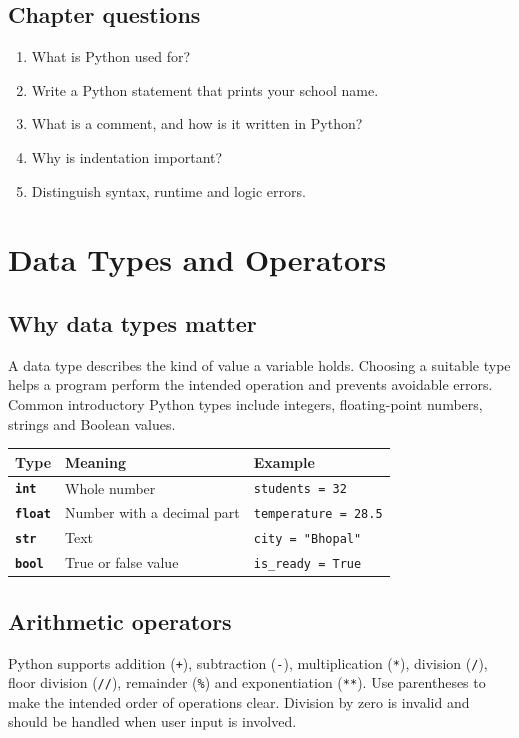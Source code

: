 \documentclass[11pt,openany,oneside]{book}
\begin{document}
\section{Chapter questions}
\begin{enumerate}
\item What is Python used for?
\item Write a Python statement that prints your school name.
\item What is a comment, and how is it written in Python?
\item Why is indentation important?
\item Distinguish syntax, runtime and logic errors.
\end{enumerate}

\chapter{Data Types and Operators}
\section{Why data types matter}
A data type describes the kind of value a variable holds. Choosing a suitable type helps a program perform the intended operation and prevents avoidable errors. Common introductory Python types include integers, floating-point numbers, strings and Boolean values.

\begin{center}
\begin{tabularx}{\textwidth}{>{\bfseries}p{} X X}
\toprule
Type & Meaning & Example\\
\midrule
\texttt{int} & Whole number & \texttt{students = 32}\\
\texttt{float} & Number with a decimal part & \texttt{temperature = 28.5}\\
\texttt{str} & Text & \texttt{city = "Bhopal"}\\
\texttt{bool} & True or false value & \texttt{is\_ready = True}\\
\bottomrule
\end{tabularx}
\end{center}

\section{Arithmetic operators}
Python supports addition (\texttt{+}), subtraction (\texttt{-}), multiplication (\texttt{*}), division (\texttt{/}), floor division (\texttt{//}), remainder (\texttt{\%}) and exponentiation (\texttt{**}). Use parentheses to make the intended order of operations clear. Division by zero is invalid and should be handled when user input is involved.
\end{document}
